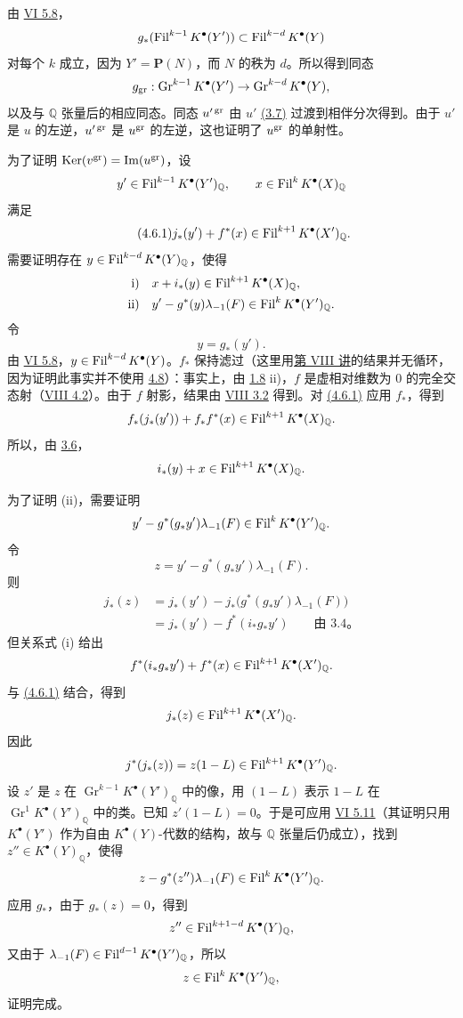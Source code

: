 由 \hyperlink{sga6.e06.cor.5-8}{VI 5.8}，
\[
  g_*(\operatorname{Fil}^{k-1}K^\bullet(Y'))\subset \operatorname{Fil}^{k-d}K^\bullet(Y)
\]
对每个 \(k\) 成立，因为 \(Y'=\mathbf P(N)\)，而 \(N\) 的秩为 \(d\)。所以得到同态
\[
  g_{\operatorname{gr}}:\operatorname{Gr}^{k-1}K^\bullet(Y')
  \to\operatorname{Gr}^{k-d}K^\bullet(Y),
\]
以及与 \(\mathbb Q\) 张量后的相应同态。同态 \(u'^{\operatorname{gr}}\) 由 \(u'\) \hyperlink{sga6.e07.thm.3-7}{(3.7)} 过渡到相伴分次得到。由于 \(u'\) 是 \(u\) 的左逆，\(u'^{\operatorname{gr}}\) 是 \(u^{\operatorname{gr}}\) 的左逆，这也证明了 \(u^{\operatorname{gr}}\) 的单射性。

为了证明 \(\operatorname{Ker}(v^{\operatorname{gr}})=\operatorname{Im}(u^{\operatorname{gr}})\)，设
\[
y'\in\operatorname{Fil}^{k-1}K^\bullet(Y')_{\mathbb Q},\qquad
x\in\operatorname{Fil}^kK^\bullet(X)_{\mathbb Q}
\]
满足
\begin{equation}\tag{4.6.1}
  j_*(y')+f^*(x)\in\operatorname{Fil}^{k+1}K^\bullet(X')_{\mathbb Q}.
\end{equation}
需要证明存在 \(y\in\operatorname{Fil}^{k-d}K^\bullet(Y)_{\mathbb Q}\)，使得
\[
\begin{aligned}
\text{i)}\quad &x+i_*(y)\in\operatorname{Fil}^{k+1}K^\bullet(X)_{\mathbb Q},\\
\text{ii)}\quad &y'-g^*(y)\lambda_{-1}(F)\in\operatorname{Fil}^{k}K^\bullet(Y')_{\mathbb Q}.
\end{aligned}
\]
令
\[
  y=g_*(y').
\]
由 \hyperlink{sga6.e06.cor.5-8}{VI 5.8}，\(y\in\operatorname{Fil}^{k-d}K^\bullet(Y)\)。\(f_*\) 保持滤过（这里用\hyperlink{sga6.e08.expose}{第 VIII 讲}的结果并无循环，因为证明此事实并不使用 \hyperlink{sga6.e07.thm.4-8}{4.8}）：事实上，由 \hyperlink{sga6.e07.prop.1-8}{1.8} ii)，\(f\) 是虚相对维数为 \(0\) 的完全交态射（\hyperlink{sga6.e08.prop.4-2}{VIII 4.2}）。由于 \(f\) 射影，结果由 \hyperlink{sga6.e08.prop.3-2}{VIII 3.2} 得到。对 \hyperlink{sga6.e07.eq.4-6-1}{(4.6.1)} 应用 \(f_*\)，得到
\[
  f_*(j_*(y'))+f_*f^*(x)\in\operatorname{Fil}^{k+1}K^\bullet(X)_{\mathbb Q}.
\]
所以，由 \hyperlink{sga6.e07.prop.3-6}{3.6}，
\[
  i_*(y)+x\in\operatorname{Fil}^{k+1}K^\bullet(X)_{\mathbb Q}.
\]

为了证明 (ii)，需要证明
\[
  y'-g^*(g_*y')\lambda_{-1}(F)\in\operatorname{Fil}^kK^\bullet(Y')_{\mathbb Q}.
\]
令
\[
  z=y'-g^*(g_*y')\lambda_{-1}(F).
\]
则
\[
\begin{aligned}
j_*(z)
  &=j_*(y')-j_*\bigl(g^*(g_*y')\lambda_{-1}(F)\bigr)\\
   &=j_*(y')-f^*(i_*g_*y')\qquad\text{由 3.4。}
\end{aligned}
\]
但关系式 (i) 给出
\[
  f^*(i_*g_*y')+f^*(x)\in\operatorname{Fil}^{k+1}K^\bullet(X')_{\mathbb Q}.
\]
与 \hyperlink{sga6.e07.eq.4-6-1}{(4.6.1)} 结合，得到
\[
  j_*(z)\in\operatorname{Fil}^{k+1}K^\bullet(X')_{\mathbb Q}.
\]
因此
\[
  j^*(j_*(z))=z(1-L)\in\operatorname{Fil}^{k+1}K^\bullet(Y')_{\mathbb Q}.
\]
设 \(z'\) 是 \(z\) 在
\(\operatorname{Gr}^{k-1}K^\bullet(Y')_{\mathbb Q}\) 中的像，用 \((1-L)\) 表示 \(1-L\) 在 \(\operatorname{Gr}^{1}K^\bullet(Y')_{\mathbb Q}\) 中的类。已知 \(z'(1-L)=0\)。于是可应用 \hyperlink{sga6.e06.prop.5-11}{VI 5.11}（其证明只用 \(K^\bullet(Y')\) 作为自由 \(K^\bullet(Y)\)-代数的结构，故与 \(\mathbb Q\) 张量后仍成立），找到 \(z''\in K^\bullet(Y)_{\mathbb Q}\)，使得
\[
  z-g^*(z'')\lambda_{-1}(F)\in\operatorname{Fil}^kK^\bullet(Y')_{\mathbb Q}.
\]
应用 \(g_*\)，由于 \(g_*(z)=0\)，得到
\[
  z''\in\operatorname{Fil}^{k+1-d}K^\bullet(Y)_{\mathbb Q},
\]
又由于 \(\lambda_{-1}(F)\in\operatorname{Fil}^{d-1}K^\bullet(Y')_{\mathbb Q}\)，所以
\[
  z\in\operatorname{Fil}^kK^\bullet(Y')_{\mathbb Q},
\]
证明完成。

